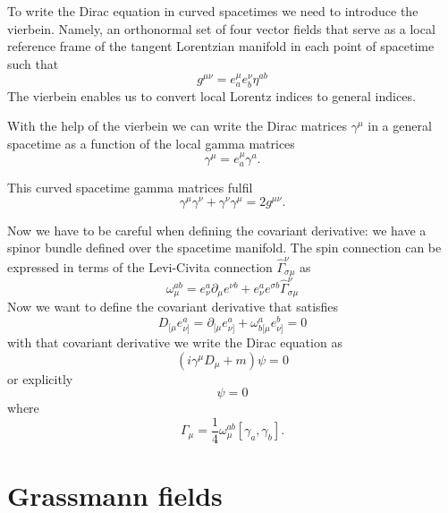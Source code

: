 To write the Dirac equation in curved spacetimes we need to introduce the vierbein. Namely, an orthonormal set of four vector fields that serve as a local reference frame of the tangent Lorentzian manifold in each point of spacetime such that
\begin{equation}
g^{\mu\nu}=e^\mu_ae^\nu_b\eta^{ab}
\end{equation}
The vierbein enables us to convert local Lorentz indices to general indices.

With the help of the vierbein we can write the Dirac matrices $\gamma^\mu$ in a general spacetime as a function of the local gamma matrices
\begin{equation}
\gamma^\mu=e^\mu_a\gamma^a.
\end{equation}

 This curved spacetime gamma matrices fulfil
 \begin{equation}
\gamma^{\mu}\gamma^{\nu}+\gamma^{\nu}\gamma^{\mu}=2g^{\mu\nu}.
 \end{equation}

Now we have to be careful when defining the covariant derivative: we have a spinor bundle defined over the spacetime manifold. The spin connection can be expressed in terms of the Levi-Civita connection $\hat\Gamma^\nu_{\sigma\mu}$ as
\begin{equation}
\omega_\mu^{ab}=e^a_\nu\partial_\mu e^{\nu b}+ e^{a}_\nu e^{\sigma b}\hat\Gamma^{\nu}_{\sigma\mu}
\end{equation}
Now we want to define the covariant derivative that satisfies
\begin{equation}
D_{[\mu}e^a_{\nu]}=\partial_{[\mu}e^a_{\nu]}+\omega^a_{b[\mu}e^{b}_{\nu]}=0
\end{equation}
with that covariant derivative we write the Dirac equation as
\begin{equation}(i\gamma^{\mu}D_\mu+m)\psi=0\end{equation}
or explicitly
\begin{equation}
[i\gamma^{\mu}\left(\partial_\mu+\Gamma_\mu\right)+m]\psi=0
\end{equation}
where
\begin{equation}
\Gamma_\mu=\frac14\omega^{ab}_\mu[\gamma_{a},\gamma_b].
\end{equation}

\section{Grassmann fields}

